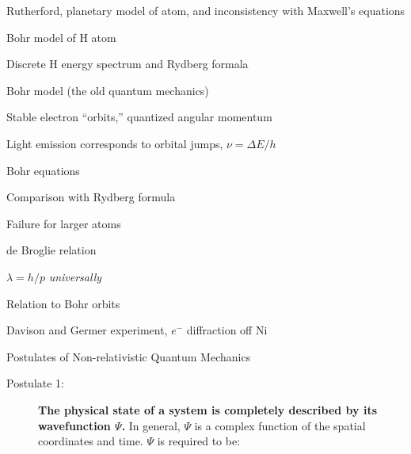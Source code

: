 \documentclass[11pt]{article}
\begin{document}
\begin{outline}
\begin{outline}
  \item Rutherford, planetary model of atom, and inconsistency with Maxwell's equations
  \item{Bohr model of H atom}
    \begin{outline}
    \item Discrete H energy spectrum and Rydberg formala
    \item Bohr model (the old quantum mechanics)
      \begin{outline}
      \item Stable electron ``orbits,'' quantized angular momentum
      \item Light emission corresponds to orbital jumps, $\nu=\Delta E/h$
      \item Bohr equations
      \item Comparison with Rydberg formula
      \item Failure for larger atoms
      \end{outline}
    \end{outline}
  \item{de Broglie relation}
    \begin{outline}
      \item{$\lambda=h/p$ {\em universally}}
      \item Relation to Bohr orbits
      \item Davison and Germer experiment, $e^-$ diffraction off Ni
    \end{outline}
  \end{outline}
  
\begin{table} 
\begin{center}
    \caption{\large{Postulates of Non-relativistic Quantum Mechanics}}
   \begin{description}
    \item[Postulate 1:] {{\bf The physical state of a system is completely described by
        its wavefunction $\Psi$.}  In general, $\Psi$ is a complex function of the spatial
      coordinates and time.  $\Psi$ is required to be:}


\end{description}
\end{center}
\end{table}
\end{outline}
\end{document}
